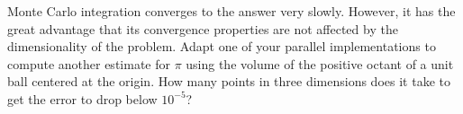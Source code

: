\documentclass[12pt,answers]{exam}
\begin{document}
\begin{questions}

\question Monte Carlo integration converges to the answer very slowly. However, it has the
great advantage that its convergence properties are not affected by the dimensionality of the
problem. Adapt one of your parallel implementations to compute another estimate for $\pi$ using
the volume of the positive octant of a unit ball centered at the origin. How many points in
three dimensions does it take to get the error to  drop below $10^{-5}$?

\end{questions}
\end{document}

